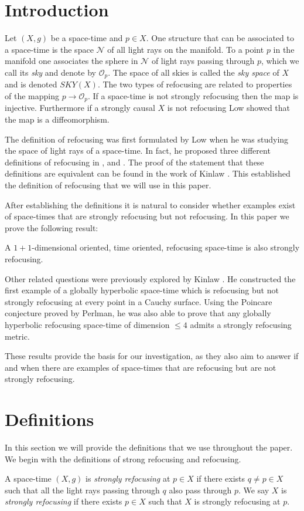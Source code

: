 \section{Introduction}
Let $(X,g)$ be a space-time and $p\in X$.  One structure that can be associated to a space-time is the space $\mathcal{N}$ of all light rays on the manifold.    To a point $p$ in the manifold one associates the sphere in $\mathcal{N}$ of light rays passing through $p$, which we call its \emph{sky} and denote by $\mathcal{O}_p$.  The space of all skies is called the \emph{sky space} of $X$ and is denoted $SKY(X)$.  The two types of refocusing are related to  properties of the mapping $p\rightarrow \mathcal{O}_p$.  If a space-time is not strongly refocusing then the map is injective.  Furthermore if a strongly causal $X$ is not refocusing Low \cite{LowNull} showed that the map is a diffeomorphism.

The definition of refocusing was first formulated by Low when he was studying the space of light rays of a space-time.  In fact, he proposed three different definitions of refocusing in \cite{LowCS}, \cite{LowSS} and \cite{LowNull}.  The proof of the statement that these definitions are equivalent can be found in the work of Kinlaw \cite{Kinlaw}.  This established the definition of refocusing that we will use in this paper.

After establishing the definitions it is natural to consider whether examples exist of space-times that are strongly refocusing but not refocusing.  In this paper we prove the following result:

\begin{prop} \label{mainProp}
A $1+1$-dimensional oriented, time oriented, refocusing space-time is also strongly refocusing.
\end{prop}

Other related questions were previously explored by Kinlaw \cite{Kinlaw}.  He constructed the first example of a globally hyperbolic space-time which is refocusing but not strongly refocusing at every point in a Cauchy surface.  Using the Poincare conjecture proved by Perlman, he was also able to prove that any globally hyperbolic refocusing space-time of dimension $\leq 4$ admits a strongly refocusing metric.

These results provide the basis for our investigation, as they also aim to answer if and when there are examples of space-times that are refocusing but are not strongly refocusing.

\section{Definitions} 
In this section we will provide the definitions that we use throughout the paper.  We begin with the definitions of strong refocusing and refocusing.
\begin{defin} \label{srefoc}
A space-time $(X, g)$ is \emph{strongly refocusing} at $p\in X$ if there exists $q\neq p \in X$ such that all the light rays passing through $q$ also pass through $p$.  We say $X$ is \emph{strongly refocusing} if there exists $p\in X$ such that $X$ is strongly refocusing at $p$.
\end{defin}

